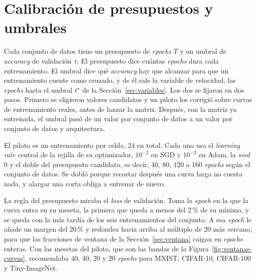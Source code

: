 \section{Calibración de presupuestos y umbrales}
\label{sec:calibracion}

Cada conjunto de datos tiene un presupuesto de \emph{epochs} $T$ y un umbral de \emph{accuracy} de validación $\tau$. El presupuesto dice cuántas \emph{epochs} dura cada entrenamiento. El umbral dice qué \emph{accuracy} hay que alcanzar para que un entrenamiento cuente como cruzado, y de él sale la variable de velocidad, las \emph{epochs} hasta el umbral $t^\star$ de la Sección~\ref{sec:variables}. Los dos se fijaron en dos pasos. Primero se eligieron valores candidatos y un piloto los corrigió sobre curvas de entrenamiento reales, antes de lanzar la matriz. Después, con la matriz ya entrenada, el umbral pasó de un valor por conjunto de datos a un valor por conjunto de datos y arquitectura.

El piloto es un entrenamiento por celda, 24 en total. Cada uno usa el \emph{learning rate} central de la rejilla de su optimizador, $10^{-2}$ en SGD y $10^{-3}$ en Adam, la \emph{seed} 0 y el doble del presupuesto candidato, es decir, 40, 80, 120 o 160 \emph{epochs} según el conjunto de datos. Se dobló porque recortar después una curva larga no cuesta nada, y alargar una corta obliga a entrenar de nuevo.

La regla del presupuesto miraba el \emph{loss} de validación. Toma la \emph{epoch} en la que la curva entra en su meseta, la primera que queda a menos del 2\,\% de su mínimo, y se queda con la más tardía de los seis entrenamientos del conjunto. A esa \emph{epoch} le añade un margen del 20\,\% y redondea hacia arriba al múltiplo de 20 más cercano, para que las fracciones de ventana de la Sección~\ref{sec:ventana} caigan en \emph{epochs} enteras. Con las mesetas del piloto, que son las bandas de la Figura~\ref{fig:ventanas-curvas}, recomendaba 40, 40, 20 y 20 \emph{epochs} para MNIST, CIFAR-10, CIFAR-100 y Tiny-ImageNet.

